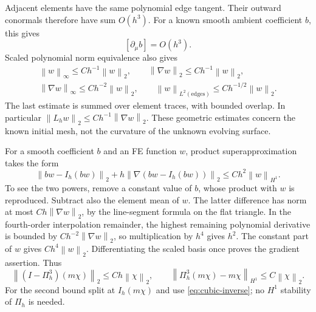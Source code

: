 \documentclass[11pt,a4paper]{article}
\numberwithin{equation}{section}
\theoremstyle{remark}
\newcommand{\norm}[1]{\left\lVert #1\right\rVert}
\begin{document}
Adjacent elements have the same polynomial edge tangent. Their outward
conormals therefore have sum \(O(h^3)\). For a known smooth ambient
coefficient \(b\), this gives
\begin{equation}\label{eq:cubic-conormal}
                    [\partial_\mu b]=O(h^3).
\end{equation}
Scaled polynomial norm equivalence also gives
\begin{equation}\label{eq:cubic-inverse}
 \begin{gathered}
 \norm w_\infty\leq Ch^{-1}\norm w_2,\qquad
 \norm{\nabla w}_2\leq Ch^{-1}\norm w_2,\\
 \norm{\nabla w}_\infty\leq Ch^{-2}\norm w_2,\qquad
 \norm w_{L^2(\text{edges})}\leq Ch^{-1/2}\norm w_2.
 \end{gathered}
\end{equation}
The last estimate is summed over element traces, with bounded overlap.
In particular \(\norm{L_hw}_2\leq Ch^{-1}\norm{\nabla w}_2\).
These geometric estimates concern the known initial mesh, not the
curvature of the unknown evolving surface.

For a smooth coefficient \(b\) and an FE function \(w\), product
superapproximation takes the form
\begin{equation}\label{eq:cubic-product}
 \norm{bw-I_h(bw)}_2+h\norm{\nabla(bw-I_h(bw))}_2
                          \leq Ch^2\norm w_{H^1}.
\end{equation}
To see the two powers, remove a constant value of \(b\), whose product
with \(w\) is reproduced. Subtract also the element mean of \(w\).
The latter difference has norm at most \(Ch\norm{\nabla w}_2\), by
the line-segment formula on the flat triangle. In the fourth-order
interpolation remainder, the highest remaining polynomial derivative
is bounded by \(Ch^{-2}\norm{\nabla w}_2\), so multiplication by
\(h^4\) gives \(h^2\). The constant part of \(w\) gives
\(Ch^4\norm w_2\). Differentiating the scaled basis once proves the
gradient assertion. Thus
\begin{equation}\label{eq:cubic-project-product}
 \norm{(I-\Pi_h^3)(m\chi)}_2\leq Ch\norm\chi_2,
 \qquad\norm{\Pi_h^3(m\chi)-m\chi}_{H^1}\leq C\norm\chi_2.
\end{equation}
For the second bound split at \(I_h(m\chi)\) and use
\eqref{eq:cubic-inverse}; no \(H^1\) stability of \(\Pi_h\) is needed.
\end{document}
